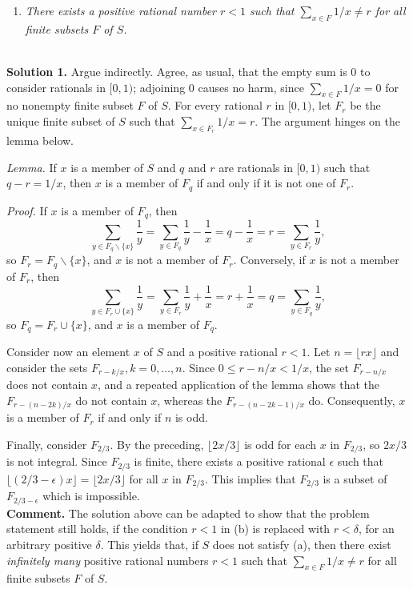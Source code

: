 \documentclass[a4paper, 12pt]{article}
\begin{document}
\begin{enumerate}
\begin{enumerate}
    \item \textit{There exists a positive rational number $r<1$ such that $\sum_{x \in F} 1/x \not = r$ for all finite subsets $F$ of $S$.}
\end{enumerate} \\

\textbf{Solution 1.} Argue indirectly. Agree, as usual, that the empty sum is 0 to consider rationals in $[0, 1)$; adjoining 0 causes no harm, since $\sum_{x \in F} 1/x = 0$ for no nonempty finite subset $F$ of $S$. For every rational $r$ in $[0, 1)$, let $F_r$ be the unique finite subset of $S$ such that $\sum_{x \in F_r} 1/x = r$.  The argument hinges on the lemma below.

\textit{Lemma. } If $x$ is a member of $S$ and $q$ and $r$ are rationals in $[0, 1)$ such that $q-r = 1/x$, then $x$ is a member of $F_q$ if and only if it is not one of $F_r$.

\textit{Proof. } If $x$ is a member of $F_q$, then
$$
\sum_{y \in F_q \backslash \{x\}} \frac{1}{y} = \sum_{y \in F_q} \frac{1}{y} - \frac{1}{x} = q - \frac{1}{x} = r = \sum_{y \in F_r} \frac{1}{y},
$$
so $F_r = F_q \backslash \{x\}$, and $x$ is not a member of $F_r$. Conversely, if $x$ is not a member of $F_r$, then
$$
\sum_{y \in F_r \cup \{x\}} \frac{1}{y} = \sum_{y \in F_r} \frac{1}{y} + \frac{1}{x} = r + \frac{1}{x} = q = \sum_{y \in F_q} \frac{1}{y},
$$
so $F_q = F_r \cup \{x\} $, and $x$ is a member of $F_q$.

Consider now an element $x$ of $S$ and a positive rational $r < 1$. Let $n = \lfloor rx \rfloor$ and consider the sets $F_{r-k/x}, k = 0, \dots, n$. Since $0 \leq r - n/x < 1/x$, the set $F_{r-n/x}$ does not contain $x$, and a repeated application of the lemma shows that the $F_{r-(n-2k)/x}$ do not contain $x$, whereas the $F_{r-(n-2k-1)/x}$ do. Consequently, $x$ is a member of $F_r$ if and only if $n$ is odd.

Finally, consider $F_{2/3}$. By the preceding, $\lfloor 2x/3 \rfloor$ is odd for each $x$ in $F_{2/3}$, so $2x/3$ is not integral. Since $F_{2/3}$ is finite, there exists a positive rational $\epsilon$ such that $\lfloor (2/3 - \epsilon) x \rfloor = \lfloor 2x/3 \rfloor$ for all $x$ in $F_{2/3}$. This implies that $F_{2/3}$ is a subset of $F_{2/3 - \epsilon}$ which is impossible. \\

\textbf{Comment. } The solution above can be adapted to show that the problem statement still holds, if the condition $r < 1$ in (b) is replaced with $r < \delta$, for an arbitrary positive $\delta$. This yields that, if $S$ does not satisfy (a), then there exist \textit{infinitely many} positive rational numbers $r < 1$ such that $\sum_{x \in F} 1/x \not = r$ for all finite subsets $F$ of $S$. \\



\end{enumerate}
\end{document}

